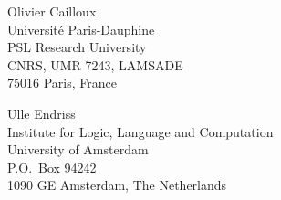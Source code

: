 \documentclass{comsoc2016}
\begin{document}
\setlength{\bibsep}{2pt}
{\small}

\begin{contact}
Olivier Cailloux\\
Université Paris-Dauphine\\
PSL Research University\\
CNRS, UMR 7243, LAMSADE\\
75016 Paris, France\\
\end{contact}

\begin{contact}
Ulle Endriss\\
Institute for Logic, Language and Computation\\
University of Amsterdam\\
P.O.\ Box 94242\\
1090 GE Amsterdam, The Netherlands\\
\end{contact}
\end{document}
